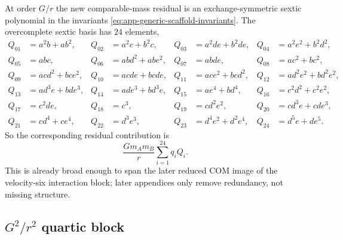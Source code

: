 \documentclass[11pt]{article}
\begin{document}
At order $G/r$ the new comparable-mass residual is an exchange-symmetric sextic
 polynomial in the invariants \eqref{eq:app-generic-scaffold-invariants}.  The
 overcomplete sextic basis has $24$ elements,
\begin{align}
Q_{01}&=a^2b+ab^2,
&
Q_{02}&=a^2c+b^2c,
&
Q_{03}&=a^2de+b^2de,
&
Q_{04}&=a^2e^2+b^2d^2,
\label{eq:app-generic-scaffold-Q-1-4}
\\[0.5ex]
Q_{05}&=abc,
&
Q_{06}&=abd^2+abe^2,
&
Q_{07}&=abde,
&
Q_{08}&=ac^2+bc^2,
\label{eq:app-generic-scaffold-Q-5-8}
\\[0.5ex]
Q_{09}&=acd^2+bce^2,
&
Q_{10}&=acde+bcde,
&
Q_{11}&=ace^2+bcd^2,
&
Q_{12}&=ad^2e^2+bd^2e^2,
\label{eq:app-generic-scaffold-Q-9-12}
\\[0.5ex]
Q_{13}&=ad^3e+bde^3,
&
Q_{14}&=ade^3+bd^3e,
&
Q_{15}&=ae^4+bd^4,
&
Q_{16}&=c^2d^2+c^2e^2,
\label{eq:app-generic-scaffold-Q-13-16}
\\[0.5ex]
Q_{17}&=c^2de,
&
Q_{18}&=c^3,
&
Q_{19}&=cd^2e^2,
&
Q_{20}&=cd^3e+cde^3,
\label{eq:app-generic-scaffold-Q-17-20}
\\[0.5ex]
Q_{21}&=cd^4+ce^4,
&
Q_{22}&=d^3e^3,
&
Q_{23}&=d^4e^2+d^2e^4,
&
Q_{24}&=d^5e+de^5.
\label{eq:app-generic-scaffold-Q-21-24}
\end{align}
So the corresponding residual contribution is
\begin{equation}
\frac{Gm_A m_B}{r}\sum_{i=1}^{24} q_i Q_i.
\label{eq:app-generic-scaffold-gr-residual}
\end{equation}
This is already broad enough to span the later reduced COM image of the
 velocity-six interaction block; later appendices only remove redundancy, not
 missing structure.

\subsection{\texorpdfstring{$G^2/r^2$}{G squared/r squared} quartic block}
\label{app:generic-scaffold-g2}
\end{document}
